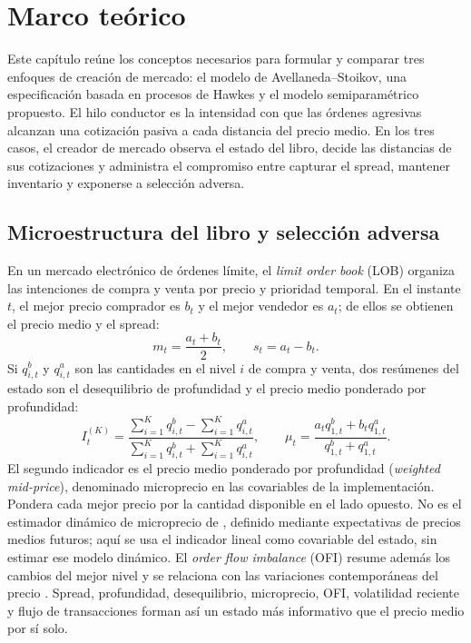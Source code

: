 \chapter{Marco teórico}
\label{chap:marco-teorico}

Este capítulo reúne los conceptos necesarios para formular y comparar tres enfoques de creación de mercado: el modelo de Avellaneda--Stoikov, una especificación basada en procesos de Hawkes y el modelo semiparamétrico propuesto. El hilo conductor es la intensidad con que las órdenes agresivas alcanzan una cotización pasiva a cada distancia del precio medio. En los tres casos, el creador de mercado observa el estado del libro, decide las distancias de sus cotizaciones y administra el compromiso entre capturar el spread, mantener inventario y exponerse a selección adversa.

\section{Microestructura del libro y selección adversa}
\label{sec:seleccion-adversa}

En un mercado electrónico de órdenes límite, el \textit{limit order book} (LOB) organiza las intenciones de compra y venta por precio y prioridad temporal. En el instante $t$, el mejor precio comprador es $b_t$ y el mejor vendedor es $a_t$; de ellos se obtienen el precio medio y el spread:
\begin{equation}
 m_t=\frac{a_t+b_t}{2},
 \qquad
 s_t=a_t-b_t.
 \label{eq:mid-spread}
\end{equation}
Si $q^{b}_{i,t}$ y $q^{a}_{i,t}$ son las cantidades en el nivel $i$ de compra y venta, dos resúmenes del estado son el desequilibrio de profundidad y el precio medio ponderado por profundidad:
\begin{equation}
 I^{(K)}_t=
 \frac{\sum_{i=1}^{K}q^{b}_{i,t}-\sum_{i=1}^{K}q^{a}_{i,t}}
 {\sum_{i=1}^{K}q^{b}_{i,t}+\sum_{i=1}^{K}q^{a}_{i,t}},
 \qquad
 \mu_t=\frac{a_tq^{b}_{1,t}+b_tq^{a}_{1,t}}
 {q^{b}_{1,t}+q^{a}_{1,t}}.
 \label{eq:imbalance-microprice}
\end{equation}
El segundo indicador es el precio medio ponderado por profundidad (\textit{weighted mid-price}), denominado microprecio en las covariables de la implementación. Pondera cada mejor precio por la cantidad disponible en el lado opuesto. No es el estimador dinámico de microprecio de \citet{Stoikov2018}, definido mediante expectativas de precios medios futuros; aquí se usa el indicador lineal como covariable del estado, sin estimar ese modelo dinámico. El \textit{order flow imbalance} (OFI) resume además los cambios del mejor nivel y se relaciona con las variaciones contemporáneas del precio \citep{ContKukanovStoikov2014}. Spread, profundidad, desequilibrio, microprecio, OFI, volatilidad reciente y flujo de transacciones forman así un estado más informativo que el precio medio por sí solo.

